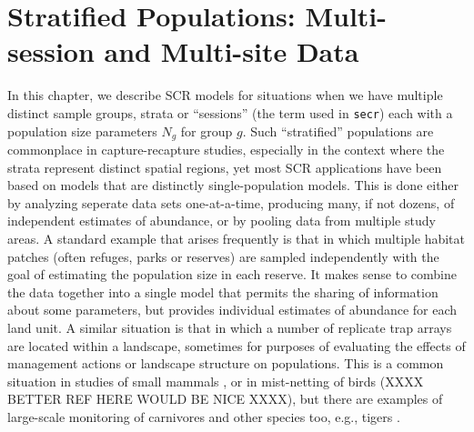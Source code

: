 \chapter{Stratified Populations: 
Multi-session and Multi-site Data}
\label{chapt.hscr}

\vspace{0.3cm}


In this chapter, we describe SCR models for situations when we have
multiple distinct sample groups, strata or ``sessions'' (the term used
in \mbox{\tt secr}) each with a population size parameters $N_{g}$ for
group $g$.
Such ``stratified'' populations are commonplace in capture-recapture
studies, especially in the context where the strata represent
distinct spatial regions, yet most SCR applications have been based
 on models that are distinctly single-population models. This is done
 either by analyzing seperate data sets one-at-a-time, producing many,
 if not dozens, of independent estimates of abundance, or by pooling
 data from multiple study areas.  A standard example that arises
frequently is that in which multiple habitat patches (often refuges,
parks or reserves) are sampled independently with the goal of
estimating the population size in each reserve. It makes sense to
combine the data together into a single model that permits the
sharing of information about some parameters, but provides individual
estimates of abundance for each land unit.  A similar situation is
that in which a number of replicate trap arrays are located within a
landscape, sometimes for purposes of evaluating the effects of
management actions or landscape structure on populations. This is a
common situation in studies of small mammals
 \citep{converse_etal:2006jwm, converse_etal:2006ea,
   converse_royle:2012}, or in mist-netting of birds
 \citep{desante_etal:1995} (XXXX BETTER REF HERE WOULD BE NICE XXXX),
but there are examples of large-scale monitoring of carnivores and
other species too, e.g., tigers \citep{jhala_etal:2011}.

